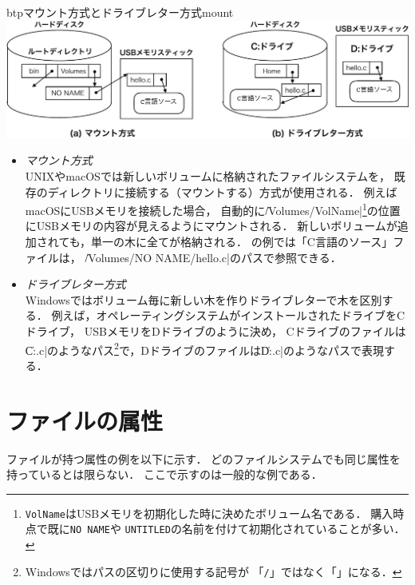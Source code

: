 \begin{myfig}{btp}{マウント方式とドライブレター方式}{mount}
  \includegraphics[scale=.6]{Fig/mount-crop.pdf}
\end{myfig}

\begin{itemize}
\item \emph{マウント方式} \\
  UNIXやmacOSでは新しいボリュームに格納されたファイルシステムを，
  既存のディレクトリに接続する（マウントする）方式が使用される．
  例えばmacOSにUSBメモリを接続した場合，
  自動的に\|/Volumes/VolName|\footnote{
    \texttt{VolName}はUSBメモリを初期化した時に決めたボリューム名である．
    購入時点で既に\texttt{NO NAME}や
    \texttt{UNTITLED}の名前を付けて初期化されていることが多い．
  }の位置にUSBメモリの内容が見えるようにマウントされる．
  新しいボリュームが追加されても，単一の木に全てが格納される．
  の例では「C言語のソース」ファイルは，
  \|/Volumes/NO NAME/hello.c|のパスで参照できる．
\item \emph{ドライブレター方式} \\
  Windowsではボリューム毎に新しい木を作りドライブレターで木を区別する．
  例えば，オペレーティングシステムがインストールされたドライブをCドライブ，
  USBメモリをDドライブのように決め，
  Cドライブのファイルは\|C:\Home\hello.c|のようなパス\footnote{
    Windowsではパスの区切りに使用する記号が
    「\texttt{/}」ではなく「\texttt{\bs}」になる．
  }で，Dドライブのファイルは\|D:\hello.c|のようなパスで表現する．
\end{itemize}

\section{ファイルの属性}
\label{fileAttribute}
ファイルが持つ属性の例を以下に示す．
どのファイルシステムでも同じ属性を持っているとは限らない．
ここで示すのは一般的な例である．

